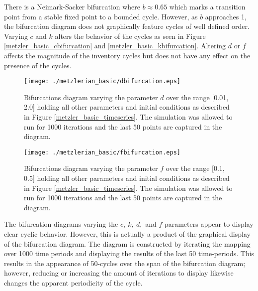 There is a Neimark-Sacker bifurcation where $b\approx0.65$ which marks a transition point from a stable fixed point to a bounded cycle. However, as $b$ approaches 1, the bifurcation diagram does not graphically feature cycles of well defined order. Varying $c$ and $k$ alters the behavior of the cycles as seen in Figure \ref{metzler_basic_cbifurcation} and \ref{metzler_basic_kbifurcation}. Altering $d$ or $f$ affects the magnitude of the inventory cycles but does not have any effect on the presence of the cycles.

\begin{figure}
    \centering
    \texttt{[image: ./metzlerian\_basic/dbifurcation.eps]}
    \caption{Bifurcations diagram varying the parameter $d$ over the range [0.01, 2.0] holding all other parameters and initial conditions as described in Figure \ref{metzler_basic_timeseries}. The simulation was allowed to run for 1000 iterations and the last 50 points are captured in the diagram.}
    \label{metzler_basic_dbifurcation}
\end{figure} 

\begin{figure}
    \centering
    \texttt{[image: ./metzlerian\_basic/fbifurcation.eps]}
    \caption{Bifurcations diagram varying the parameter $f$ over the range [0.1, 0.5] holding all other parameters and initial conditions as described in Figure \ref{metzler_basic_timeseries}. The simulation was allowed to run for 1000 iterations and the last 50 points are captured in the diagram.}
    \label{metzler_basic_fbifurcation}
\end{figure}

The bifurcation diagrams varying the $c,\ k,\ d,$ and $f$ parameters appear to display clear cyclic behavior. However, this is actually a product of the graphical display of the bifurcation diagram. The diagram is constructed by iterating the mapping over 1000 time periods and displaying the results of the last 50 time-periods. This results in the appearance of 50-cycles over the span of the bifurcation diagram; however, reducing or increasing the amount of iterations to display likewise changes the apparent periodicity of the cycle.

